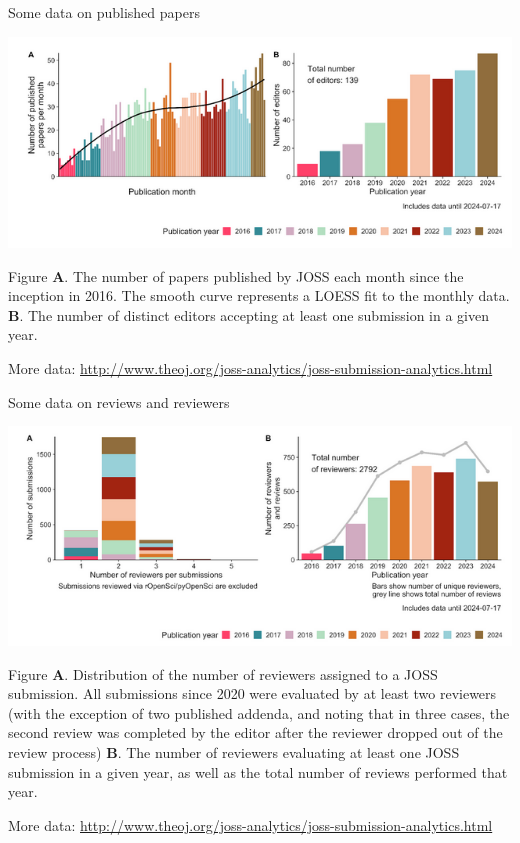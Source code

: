 \begin{frame}{Some data on published papers}

\includegraphics[width=\linewidth]{papers-per-year.png}

Figure \textbf{A}. The number of papers published by JOSS each month since the inception in 2016. The smooth curve represents a LOESS fit to the monthly data. \textbf{B}. The number of distinct editors accepting at least one submission in a given year.

{\tiny More data: \url{http://www.theoj.org/joss-analytics/joss-submission-analytics.html}}    
\end{frame}

\begin{frame}{Some data on reviews and reviewers}

\includegraphics[width=\linewidth]{reviews-and-reviewers}

\small Figure \textbf{A}. Distribution of the number of reviewers assigned to a JOSS submission. All submissions since 2020 were evaluated by at least two reviewers (with the exception of two published addenda, and noting that in three cases, the second review was completed by the editor after the reviewer dropped out of the review process) \textbf{B}. The number of reviewers evaluating at least one JOSS submission in a given year, as well as the total number of reviews performed that year. 


{\tiny More data: \url{http://www.theoj.org/joss-analytics/joss-submission-analytics.html}}    
\end{frame}

